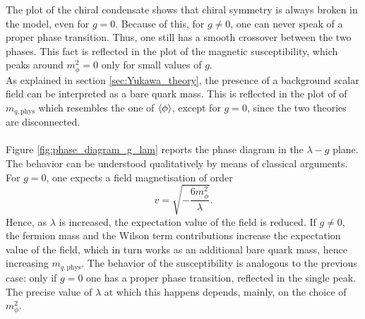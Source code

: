 The plot of the chiral condensate shows that chiral symmetry is always broken in the model, even for $g=0$. Because of this, for $g \neq 0$, one can never speak of a proper phase transition. Thus, one still has a smooth crossover between the two phases. This fact is reflected in the plot of the magnetic susceptibility, which peaks around $m_\phi^2 = 0$ only for small values of $g$. \\
As explained in section \ref{sec:Yukawa_theory}, the presence of a background scalar field can be interpreted as a bare quark mass. This is reflected in the plot of of $m_{q, \text{phys}}$ which resembles the one of $\left\langle \phi \right\rangle$, except for $g=0$, since the two theories are disconnected. \\~\\
Figure \ref{fig:phase_diagram_g_lam} reports the phase diagram in the $\lambda - g$ plane. The behavior can be understood qualitatively by means of classical arguments. 
For $g=0$, one expects a field magnetisation of order 
\begin{equation*}
    v = \sqrt{-\frac{6 m_\phi^2}{\lambda}}.
\end{equation*}
Hence, as $\lambda$ is increased, the expectation value of the field is reduced.
If $g \neq 0$, the fermion mass and the Wilson term contributions increase the expectation value of the field, which in turn works as an additional bare quark mass, hence increasing $m_{q, \text{phys}}$. The behavior of the susceptibility is analogous to the previous case: only if $g=0$ one has a proper phase transition, reflected in the single peak.
The precise value of $\lambda$ at which this happens depends, mainly, on the choice of $m_\phi^2$.
